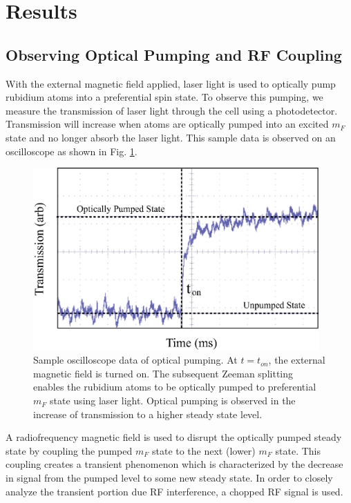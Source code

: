 

\section{Results}\label{results}

\subsection{Observing Optical Pumping and RF Coupling}\label{ObservingOpticalPumpingandRFCoupling}

With the external magnetic field applied, laser light is used to optically pump rubidium atoms into a preferential spin state.  To observe this pumping, we measure the transmission of laser light through the cell using a photodetector.  Transmission will increase when atoms are optically pumped into an excited $m_F$ state and no longer absorb the laser light. This sample data is observed on an oscilloscope as shown in Fig. \ref{fig:raw_data}.
\begin{figure}[htbp]
\begin{center}
\includegraphics[height=70mm]{./figures/raw_data.eps}
\caption{\small{Sample oscilloscope data of optical pumping. At $t=t_{on}$, the external magnetic field is turned on. The subsequent Zeeman splitting enables the rubidium atoms to be optically pumped to preferential $m_F$ state using laser light.  Optical pumping is observed in the increase of transmission to a higher steady state level.}}
\label{fig:raw_data}
\end{center}
\end{figure}
A radiofrequency magnetic field is used to disrupt the optically pumped steady state by coupling the pumped $m_F$ state to the next (lower) $m_F$ state.  This coupling creates a transient phenomenon which is characterized by the decrease in signal from the pumped level to some new steady state.  In order to closely analyze the transient portion due RF interference, a chopped RF signal is used.  
